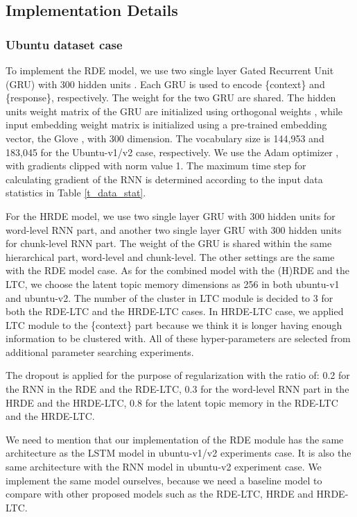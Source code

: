 \documentclass[11pt,a4paper]{article}
\begin{document}
\subsection{Implementation Details}
\subsubsection{Ubuntu dataset case} To implement the RDE model, we use two single layer Gated Recurrent Unit (GRU) \cite{chung2014empirical} with 300 hidden units .
Each GRU is used to encode \{context\} and \{response\}, respectively. The weight for the two GRU are shared. The hidden units weight matrix of the GRU are initialized using orthogonal weights \cite{saxe2013exact}, while input embedding weight matrix is initialized using a pre-trained embedding vector, the Glove \cite{pennington2014glove}, with 300 dimension. The vocabulary size is 144,953 and 183,045 for the Ubuntu-v1/v2 case, respectively.
We use the Adam optimizer \cite{kingma2014adam}, with gradients clipped with norm value 1. The maximum time step for calculating gradient of the RNN is determined according to the input data statistics in Table \ref{t_data_stat}. 

For the HRDE model, we use two single layer GRU with 300 hidden units for word-level RNN part, and another two single layer GRU with 300 hidden units for chunk-level RNN part. The weight of the GRU is shared within the same hierarchical part, word-level and chunk-level. The other settings are the same with the RDE model case. As for the combined model with the (H)RDE and the LTC, we choose the latent topic memory dimensions as 256 in both ubuntu-v1 and ubuntu-v2. The number of the cluster in LTC module is decided to 3 for both the RDE-LTC and the HRDE-LTC cases. In HRDE-LTC case, we applied LTC module to the \{context\} part because  we think it is longer having enough information to be clustered with.
All of these hyper-parameters are selected from additional parameter searching experiments.

The dropout \cite{srivastava2014dropout} is applied for the purpose of  regularization with the ratio of: 0.2 for the RNN in the RDE and the RDE-LTC, 0.3 for the word-level RNN part in the HRDE and the HRDE-LTC, 0.8 for the latent topic memory in the RDE-LTC and the HRDE-LTC.

We need to mention that our implementation of the RDE module has the same architecture as the LSTM model \cite{kadlec2015improved} in ubuntu-v1/v2 experiments case. It is also the same architecture with the RNN model \cite{baudivs2016sentence} in ubuntu-v2 experiment case. 
We implement the same model ourselves, because we need a baseline model to compare with other proposed models such as the RDE-LTC, HRDE and HRDE-LTC.
\end{document}
